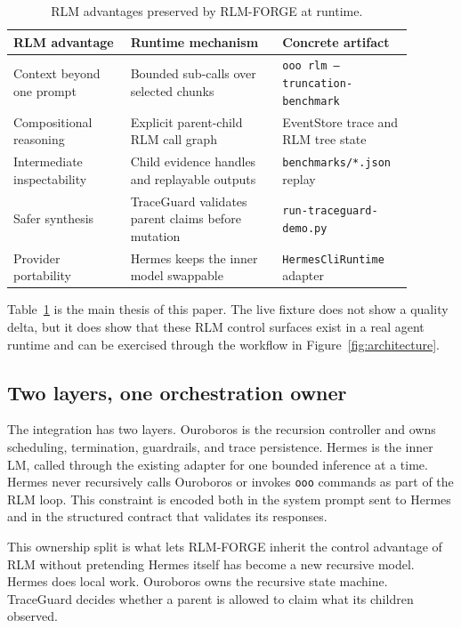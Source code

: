 \documentclass[11pt,a4paper]{article}
\begin{document}
\begin{table}[t]
\centering
\caption{RLM advantages preserved by RLM-FORGE at runtime.}
\label{tab:runtime}
\small
\begin{tabular}{%
  >{\raggedright\arraybackslash}p{0.27\linewidth}
  >{\raggedright\arraybackslash}p{0.35\linewidth}
  >{\raggedright\arraybackslash}p{0.27\linewidth}}
\toprule
RLM advantage & Runtime mechanism & Concrete artifact \\
\midrule
Context beyond one prompt & Bounded sub-calls over selected chunks &
\texttt{ooo rlm --truncation-benchmark} \\
Compositional reasoning & Explicit parent-child RLM call graph &
EventStore trace and RLM tree state \\
Intermediate inspectability & Child evidence handles and replayable outputs &
\texttt{benchmarks/*.json} replay \\
Safer synthesis & TraceGuard validates parent claims before mutation &
\texttt{run-traceguard-demo.py} \\
Provider portability & Hermes keeps the inner model swappable &
\texttt{HermesCliRuntime} adapter \\
\bottomrule
\end{tabular}
\end{table}

Table~\ref{tab:runtime} is the main thesis of this paper. The live fixture
does not show a quality delta, but it does show that these RLM control
surfaces exist in a real agent runtime and can be exercised through the
workflow in Figure~\ref{fig:architecture}.

\subsection{Two layers, one orchestration owner}
\label{sec:layers}

The integration has two layers. Ouroboros is the recursion controller and
owns scheduling, termination, guardrails, and trace persistence. Hermes is
the inner LM, called through the existing adapter for one bounded
inference at a time. Hermes never recursively calls Ouroboros or invokes
\texttt{ooo} commands as part of the RLM loop. This constraint is encoded
both in the system prompt sent to Hermes and in the structured contract that
validates its responses.

This ownership split is what lets RLM-FORGE inherit the control advantage of
RLM without pretending Hermes itself has become a new recursive model. Hermes
does local work. Ouroboros owns the recursive state machine. TraceGuard decides
whether a parent is allowed to claim what its children observed.
\end{document}
